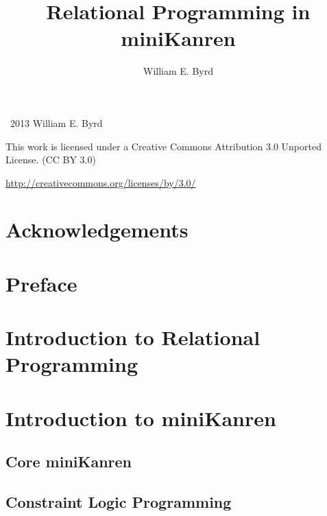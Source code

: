 \documentclass[onecolumn, 11pt, oneside, openright]{book}
\begin{document}
\begin{schemeregion}


\frontmatter

\VerbatimFootnotes

\title{\thesistitle{}}

\author{\thesisauthor{}}

\thispagestyle{empty}


\title{Relational Programming in miniKanren}
\author{William E. Byrd}
\maketitle

\newpage
\thispagestyle{empty}
\large
\noindent
\textcopyright~2013 William E. Byrd

\vspace{5mm}

\huge
\noindent
\ccLogo
\ccAttribution

\vspace{2mm}

\large
\noindent
This work is licensed under a Creative Commons Attribution 3.0 Unported License.
(CC BY 3.0)

\noindent
\url{http://creativecommons.org/licenses/by/3.0/}
\normalsize

\tableofcontents

\chapter{Acknowledgements}
\chapter{Preface}

\mainmatter

\chapter{Introduction to Relational Programming}

\chapter{Introduction to miniKanren}
\section{Core miniKanren}
\section{Constraint Logic Programming}


\end{schemeregion}
\end{document}
